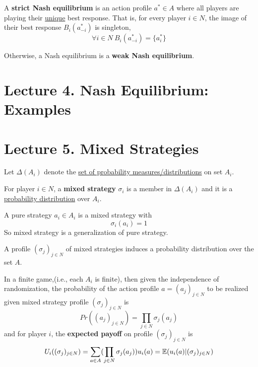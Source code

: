 \documentclass[11pt]{article}
\begin{document}
		\begin{definition}[lec.3]
			A \textbf{strict Nash equilibrium} is an action profile $a^* \in A$ where all players are playing their \ul{unique} best response. That is, for every player $i \in N$, the image of their best response $B_i(a_{-i}^*)$ is singleton,
			\[
				\forall i \in N\ B_i(a_{-i}^*) = \{a_i^*\}
			\]
		\end{definition}
		
		\begin{definition}[lec.3]
			Otherwise, a Nash equilibrium is a \textbf{weak Nash equilibrium}.
		\end{definition}

	\section{Lecture 4. Nash Equilibrium: Examples}
	\section{Lecture 5. Mixed Strategies}
		\begin{notation}[pg.32]
			Let $\Delta(A_i)$ denote the \ul{set of probability measures/distributions} on set $A_i$.
		\end{notation}
		\begin{definition}[lec.5]
			For player $i \in N$, a \textbf{mixed strategy} $\sigma_i$ is a member in $\Delta(A_i)$ and it is a \ul{probability distribution} over $A_i$.
		\end{definition}
		
		\begin{remark}[lec.5]
			A pure strategy $a_i \in A_i$ is a mixed strategy with 
			\[
				\sigma_i(a_i) = 1
			\]
			So mixed strategy is a generalization of pure strategy.
		\end{remark}
		
		\begin{definition}[pg.32]
			A profile $(\sigma_j)_{j\in N}$ of mixed strategies induces a probability distribution over the set $A$.
		\end{definition}
		
		\begin{proposition}[pg.32]
			In a finite game,(i.e., each $A_i$ is finite), then given the independence of randomization, the probability of the action profile $a = (a_j)_{j \in N}$ to be realized given mixed strategy profile $(\sigma_j)_{j\in N}$ is
			\[
				Pr((a_j)_{j \in N}) = \prod_{j \in N} \sigma_j(a_j)
			\]
			and for player $i$, the \textbf{expected payoff} on profile $(\sigma_j)_{j\in N}$ is 
			\[
				U_i((\sigma_{j})_{j \in N}) = \sum_{a \in A} (\prod_{j \in N} \sigma_j(a_j)) u_i(a) = \mathbb{E}({u_i(a)|(\sigma_j)_{j \in N}})
			\]
		\end{proposition}
		
\end{document}
